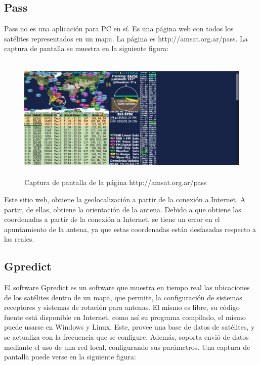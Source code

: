 \subsection{Pass}
Pass no es una aplicación para PC en sí. Es una página web con todos los satélites representados en un mapa. La página es http://amsat.org.ar/pass. La captura de pantalla se muestra en la siguiente figura:%
\begin{figure}[ht]
	\centering
	\includegraphics[width=\linewidth, height= 6cm]{pass}
	\caption{Captura de pantalla de la página http://amsat.org.ar/pass }
	\label{fig:iu_pass}
\end{figure}

Este sitio web, obtiene la geolocalización a partir de la conexión a Internet. A partir, de ellas, obtiene la orientación de la antena. Debido a que obtiene las coordenadas a partir de la conexión a Internet, se tiene un error en el apuntamiento de la antena, ya que estas coordenadas están desfasadas respecto a las reales.    

\subsection{Gpredict}

El software Gpredict es un software que muestra en tiempo real las ubicaciones de los satélites dentro de un mapa, que permite, la configuración de sistemas receptores y sistemas de rotación para antenas. El mismo es libre, su código fuente está disponible en Internet, como así su programa compilado, el mismo puede usarse en Windows y Linux. Este, provee una base de datos de satélites, y se actualiza con la frecuencia que se configure. Además, soporta envió de datos mediante el uso de una red local, configurando sus parámetros. Una captura de pantalla puede verse en la siguiente figura:  %


